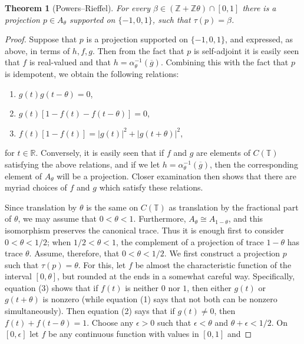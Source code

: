 \documentclass{book}
\newtheorem{theorem}[definition]{Theorem}
\begin{document}
\begin{theorem}[Powers--Rieffel]\label{thm:PowersRieffelProjection}
  For every \(\beta\in(\mathbb{Z}+\mathbb{Z}\theta)\cap[0,1]\) there is a projection \(p\in A_\theta\) supported on \(\{-1,0,1\}\), such that \(\tau(p)=\beta\).
\end{theorem}
\begin{proof}
  Suppose that \(p\) is a projection supported on \(\{-1,0,1\}\), and expressed, as above, 
  in terms of \(h,f,g\). Then from the fact that \(p\) is self-adjoint it is easily seen that \(f\) is 
  real-valued and that \(h=\alpha_\theta^{-1}(\overline{g})\). Combining this with the fact that \(p\) is idempotent, we obtain the following relations:
  \begin{enumerate}
    \item \(g(t)g(t-\theta)=0\),
    \item \(g(t)[1-f(t)-f(t-\theta)]=0\),
    \item \(f(t)[1-f(t)]=|g(t)|^2+|g(t+\theta)|^2\),
  \end{enumerate}
for \(t\in\mathbb{R}\). Conversely, it is easily seen that if \(f\) and \(g\) are
elements of \(C(\mathbb{T})\) satisfying the above relations, and if we let
\(h=\alpha_\theta^{-1}(\overline{g})\),
then the corresponding element of \(A_\theta\) will be a projection. Closer examination then shows that there are 
myriad choices of \(f\) and \(g\) which satisfy these relations.\par
Since translation by \(\theta\) is the same on \(C(\mathbb{T})\) as translation by
the fractional part of \(\theta\), we may assume that \(0<\theta<1\). Furthermore,
\(A_\theta\cong A_{1-\theta}\), and this isomorphism preserves the canonical trace.
Thus it is enough first to consider \(0<\theta<1/2\); when
\(1/2<\theta<1\), the complement of a projection of trace \(1-\theta\)
has trace \(\theta\). Assume, therefore, that \(0<\theta<1/2\). We first
construct a projection \(p\) such that \(\tau(p)=\theta\). For this, let \(f\) be
almost the characteristic function of the interval \([0,\theta]\), but rounded at the ends
in a somewhat careful way. Specifically, equation (3) shows that if \(f(t)\) is neither
\(0\) nor \(1\), then either \(g(t)\) or \(g(t+\theta)\) is nonzero (while equation (1) says
that not both can be nonzero simultaneously). Then equation (2) says that if \(g(t)\neq0\), then
\(f(t)+f(t-\theta)=1\). Choose any \(\epsilon>0\) such that \(\epsilon<\theta\) and \(\theta+\epsilon<1/2\).
On \([0,\epsilon]\) let \(f\) be any continuous function with values in \([0,1]\) and

\end{proof}
\end{document}
